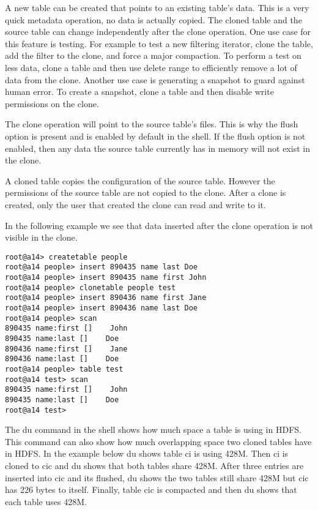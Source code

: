 A new table can be created that points to an existing table's data.  This is a
very quick metadata operation, no data is actually copied.  The cloned table
and the source table can change independently after the clone operation.  One
use case for this feature is testing.  For example to test a new filtering
iterator, clone the table, add the filter to the clone, and force a major
compaction.  To perform a test on less data, clone a table and then use delete
range to efficiently remove a lot of data from the clone.  Another use case is
generating a snapshot to guard against human error.  To create a snapshot,
clone a table and then disable write permissions on the clone.

The clone operation will point to the source table's files.  This is why the
flush option is present and is enabled by default in the shell.  If the flush
option is not enabled, then any data the source table currently has in memory
will not exist in the clone.

A cloned table copies the configuration of the source table.  However the
permissions of the source table are not copied to the clone.  After a clone is
created, only the user that created the clone can read and write to it.

In the following example we see that data inserted after the clone operation is
not visible in the clone.

\small
\begin{verbatim}
root@a14> createtable people
root@a14 people> insert 890435 name last Doe
root@a14 people> insert 890435 name first John
root@a14 people> clonetable people test  
root@a14 people> insert 890436 name first Jane
root@a14 people> insert 890436 name last Doe  
root@a14 people> scan
890435 name:first []    John
890435 name:last []    Doe
890436 name:first []    Jane
890436 name:last []    Doe
root@a14 people> table test
root@a14 test> scan
890435 name:first []    John
890435 name:last []    Doe
root@a14 test> 
\end{verbatim}
\normalsize

The du command in the shell shows how much space a table is using in HDFS.
This command can also show how much overlapping space two cloned tables have in
HDFS.  In the example below du shows table ci is using 428M.  Then ci is cloned
to cic and du shows that both tables share 428M.  After three entries are
inserted into cic and its flushed, du shows the two tables still share 428M but
cic has 226 bytes to itself.  Finally, table cic is compacted and then du shows
that each table uses 428M.


